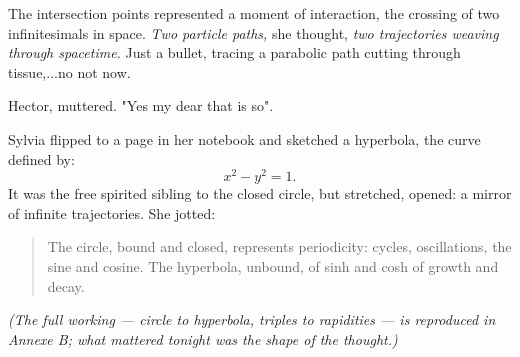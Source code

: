 The intersection points represented a moment of interaction, the crossing of two infinitesimals in space. \emph{Two particle paths,} she thought, \emph{two trajectories weaving through spacetime.} Just a bullet, tracing a parabolic path cutting through tissue,...no not now.

Hector, muttered. "Yes my dear that is so".

Sylvia flipped to a page in her notebook and sketched a hyperbola, the curve defined by:
\[
x^2 - y^2 = 1.
\]
It was the free spirited sibling to the closed circle, but stretched, opened: a mirror of infinite trajectories. She jotted:
\begin{quote}
The circle, bound and closed, represents periodicity: cycles, oscillations, the sine and cosine. The hyperbola, unbound, of sinh and cosh of growth and decay.
\end{quote}

\textit{(The full working --- circle to hyperbola, triples to rapidities --- is reproduced in Annexe B; what mattered tonight was the shape of the thought.)}

